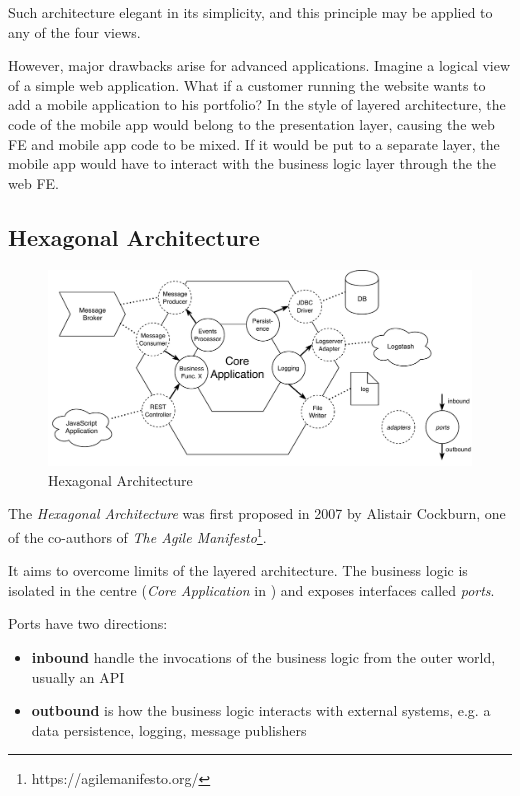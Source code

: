 \documentclass[thesis=M,english,hidelinks]{FITthesis}[2012/10/20]
\begin{document}
Such architecture elegant in its simplicity, and this principle may be applied to any of the four views.

However, major drawbacks arise for advanced applications. Imagine a logical view of a simple web application. What if a customer running the website wants to add a mobile application to his portfolio? In the style of layered architecture, the code of the mobile app would belong to the presentation layer, causing the web \acrshort{FE} and mobile app code to be mixed. If it would be put to a separate layer, the mobile app would have to interact with the business logic layer through the the web \acrshort{FE}.

\subsection{Hexagonal Architecture}
\begin{figure}[b]
  \centering
    \includegraphics[width=\textwidth]{images/hexagonal_arch.pdf}
    \caption{Hexagonal Architecture}
    \label{fig:hexagonal_arch}
\end{figure}

The \textit{Hexagonal Architecture} was first proposed in 2007 by Alistair Cockburn, one of the co-authors of \textit{The Agile Manifesto}\footnote{https://agilemanifesto.org/}.

It aims to overcome limits of the layered architecture. The business logic is isolated in the centre (\textit{Core Application} in ) and exposes interfaces called \textit{ports}.

Ports have two directions:
\begin{itemize}
    \item \textbf{inbound} handle the invocations of the business logic from the outer world, usually an \acrlong{API}
    \item \textbf{outbound} is how the business logic interacts with external systems, e.g. a data persistence, logging, message publishers
\end{itemize}
\end{document}
